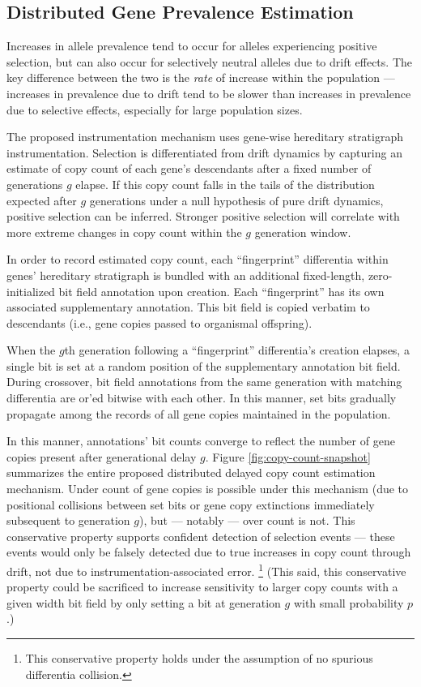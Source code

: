 \subsection{Distributed Gene Prevalence Estimation}
\label{sec:dist-gene-prevalence-est}



Increases in allele prevalence tend to occur for alleles experiencing positive selection, but can also occur for selectively neutral alleles due to drift effects.
The key difference between the two is the \textit{rate} of increase within the population --- increases in prevalence due to drift tend to be slower than increases in prevalence due to selective effects, especially for large population sizes.

The proposed instrumentation mechanism uses gene-wise hereditary stratigraph instrumentation.
Selection is differentiated from drift dynamics by capturing an estimate of copy count of each gene's descendants after a fixed number of generations $g$ elapse.
If this copy count falls in the tails of the distribution expected after $g$ generations under a null hypothesis of pure drift dynamics, positive selection can be inferred.
Stronger positive selection will correlate with more extreme changes in copy count within the $g$ generation window.

In order to record estimated copy count, each ``fingerprint'' differentia within genes' hereditary stratigraph is bundled with an additional fixed-length, zero-initialized bit field annotation upon creation.
Each ``fingerprint'' has its own associated supplementary annotation.
This bit field is copied verbatim to descendants (i.e., gene copies passed to organismal offspring).

When the $g$th generation following a ``fingerprint'' differentia's creation elapses, a single bit is set at a random position of the supplementary annotation bit field.
During crossover, bit field annotations from the same generation with matching differentia are or'ed bitwise with each other.
In this manner, set bits gradually propagate among the records of all gene copies maintained in the population.

In this manner, annotations' bit counts converge to reflect the number of gene copies present after generational delay $g$.
Figure \ref{fig:copy-count-snapshot} summarizes the entire proposed distributed delayed copy count estimation mechanism.
Under count of gene copies is possible under this mechanism (due to positional collisions between set bits or gene copy extinctions immediately subsequent to generation $g$), but --- notably --- over count is not.
This conservative property supports confident detection of selection events --- these events would only be falsely detected due to true increases in copy count through drift, not due to instrumentation-associated error.%
\footnote{This conservative property holds under the assumption of no spurious differentia collision.}
(This said, this conservative property could be sacrificed to increase sensitivity to larger copy counts with a given width bit field by only setting a bit at generation $g$ with small probability $p$.)

